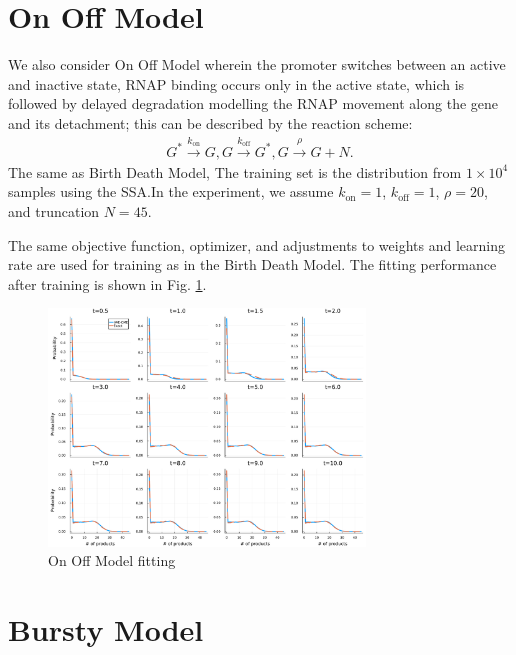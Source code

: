\documentclass[a4paper,10pt]{article}
\begin{document}
\section{On Off Model}
We also consider On Off Model wherein the promoter switches between an active and inactive state, RNAP binding occurs only in the active state, which is followed by delayed degradation modelling the RNAP movement along the gene and its detachment; this can be described by the reaction scheme:
\begin{equation}\label{on-off}
	\begin{aligned}
	G^*\xrightarrow{k_{\text{on}}} G,
	G\xrightarrow{k_{\text{off}}}G^*,
	G\xrightarrow{\rho}G+N.
	\end{aligned}
\end{equation}
The same as Birth Death Model, The training set is the distribution from $1 \times 10^4$ samples using the SSA.In the experiment, we assume $k_{\text{on}}=1$, $k_{\text{off}}=1$, $\rho=20$, and truncation $N=45$.

The same objective function, optimizer, and adjustments to weights and learning rate are used for training as in the Birth Death Model. The fitting performance after training is shown in Fig. \ref{On Off Model fitting}. 

\begin{figure}[h]
	\centering
	\includegraphics[width=0.75\textwidth]{Figs/On_Off_fitting.pdf}
	\caption{On Off Model fitting}\label{On Off Model fitting}  
\end{figure}

\section{Bursty Model}
\end{document}
